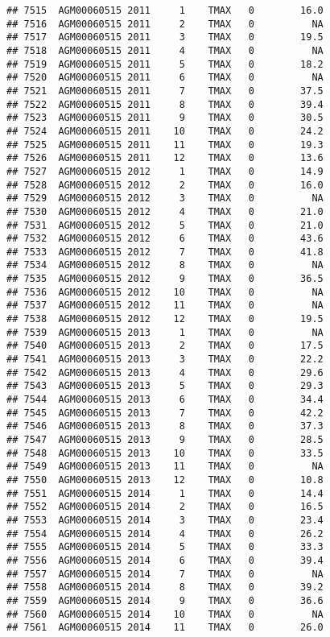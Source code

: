 \documentclass{article}\usepackage[]{graphicx}\usepackage[]{color}
\makeatletter
\newenvironment{kframe}{%
 \def\at@end@of@kframe{}%
 \ifinner\ifhmode%
  \def\at@end@of@kframe{\end{minipage}}%
  \begin{minipage}{\columnwidth}%
 \fi\fi%
 \def\FrameCommand##1{\hskip\@totalleftmargin \hskip-\fboxsep
 \colorbox{shadecolor}{##1}\hskip-\fboxsep
     \hskip-\linewidth \hskip-\@totalleftmargin \hskip\columnwidth}%
 \MakeFramed {\advance\hsize-\width
   \@totalleftmargin\z@ \linewidth\hsize
   \@setminipage}}%
 {\par\unskip\endMakeFramed%
 \at@end@of@kframe}
\newenvironment{knitrout}{}{} %
\makeatother
\begin{document}
\begin{knitrout}
\begin{kframe}
\begin{verbatim}
## 7515  AGM00060515 2011     1    TMAX   0        16.0
## 7516  AGM00060515 2011     2    TMAX   0          NA
## 7517  AGM00060515 2011     3    TMAX   0        19.5
## 7518  AGM00060515 2011     4    TMAX   0          NA
## 7519  AGM00060515 2011     5    TMAX   0        18.2
## 7520  AGM00060515 2011     6    TMAX   0          NA
## 7521  AGM00060515 2011     7    TMAX   0        37.5
## 7522  AGM00060515 2011     8    TMAX   0        39.4
## 7523  AGM00060515 2011     9    TMAX   0        30.5
## 7524  AGM00060515 2011    10    TMAX   0        24.2
## 7525  AGM00060515 2011    11    TMAX   0        19.3
## 7526  AGM00060515 2011    12    TMAX   0        13.6
## 7527  AGM00060515 2012     1    TMAX   0        14.9
## 7528  AGM00060515 2012     2    TMAX   0        16.0
## 7529  AGM00060515 2012     3    TMAX   0          NA
## 7530  AGM00060515 2012     4    TMAX   0        21.0
## 7531  AGM00060515 2012     5    TMAX   0        21.0
## 7532  AGM00060515 2012     6    TMAX   0        43.6
## 7533  AGM00060515 2012     7    TMAX   0        41.8
## 7534  AGM00060515 2012     8    TMAX   0          NA
## 7535  AGM00060515 2012     9    TMAX   0        36.5
## 7536  AGM00060515 2012    10    TMAX   0          NA
## 7537  AGM00060515 2012    11    TMAX   0          NA
## 7538  AGM00060515 2012    12    TMAX   0        19.5
## 7539  AGM00060515 2013     1    TMAX   0          NA
## 7540  AGM00060515 2013     2    TMAX   0        17.5
## 7541  AGM00060515 2013     3    TMAX   0        22.2
## 7542  AGM00060515 2013     4    TMAX   0        29.6
## 7543  AGM00060515 2013     5    TMAX   0        29.3
## 7544  AGM00060515 2013     6    TMAX   0        34.4
## 7545  AGM00060515 2013     7    TMAX   0        42.2
## 7546  AGM00060515 2013     8    TMAX   0        37.3
## 7547  AGM00060515 2013     9    TMAX   0        28.5
## 7548  AGM00060515 2013    10    TMAX   0        33.5
## 7549  AGM00060515 2013    11    TMAX   0          NA
## 7550  AGM00060515 2013    12    TMAX   0        10.8
## 7551  AGM00060515 2014     1    TMAX   0        14.4
## 7552  AGM00060515 2014     2    TMAX   0        16.5
## 7553  AGM00060515 2014     3    TMAX   0        23.4
## 7554  AGM00060515 2014     4    TMAX   0        26.2
## 7555  AGM00060515 2014     5    TMAX   0        33.3
## 7556  AGM00060515 2014     6    TMAX   0        39.4
## 7557  AGM00060515 2014     7    TMAX   0          NA
## 7558  AGM00060515 2014     8    TMAX   0        39.2
## 7559  AGM00060515 2014     9    TMAX   0        36.6
## 7560  AGM00060515 2014    10    TMAX   0          NA
## 7561  AGM00060515 2014    11    TMAX   0        26.0

\end{verbatim}
\end{kframe}
\end{knitrout}
\end{document}
